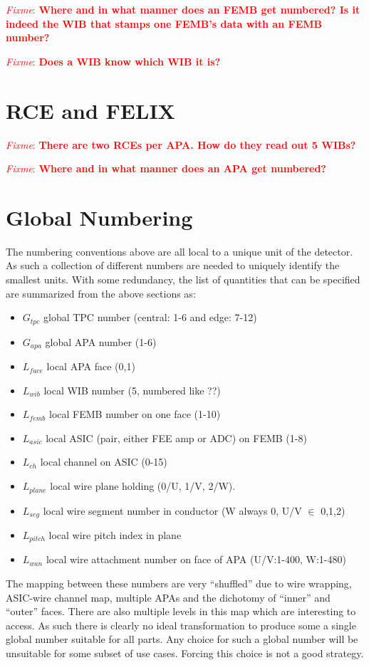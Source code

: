 \documentclass[pdftex,12pt,letter]{article}
\newcommand{\fixme}[1]{\textcolor{red}{\textit{Fixme}: \textbf{#1}}}
\begin{document}
\fixme{Where and in what manner does an FEMB get numbered?  Is it indeed the WIB that stamps one FEMB's data with an FEMB number?}

\fixme{Does a WIB know which WIB it is?}

\section{RCE and FELIX}

\fixme{There are two RCEs per APA.  How do they read out 5 WIBs?}

\fixme{Where and in what manner does an APA get numbered?}

\section{Global Numbering}

The numbering conventions above are all local to a unique unit of the
detector.  As such a collection of different numbers are needed to
uniquely identify the smallest units.  With some redundancy, the list
of quantities that can be specified are summarized from the above
sections as:

\begin{itemize}
\item $G_{tpc}$ global TPC number (central: 1-6 and edge: 7-12)
\item $G_{apa}$ global APA number (1-6)
\item $L_{face}$ local APA face (0,1)
\item $L_{wib}$ local WIB number (5, numbered like ??)
\item $L_{femb}$ local FEMB number on one face (1-10)
\item $L_{asic}$ local ASIC (pair, either FEE amp or ADC) on FEMB (1-8)
\item $L_{ch}$ local channel on ASIC (0-15)
\item $L_{plane}$ local wire plane holding (0/U, 1/V, 2/W).
\item $L_{seg}$ local wire segment number in conductor (W always 0, U/V $\in$ 0,1,2)
\item $L_{pitch}$ local wire pitch index in plane
\item $L_{wan}$ local wire attachment number on face of APA (U/V:1-400, W:1-480)
\end{itemize}

The mapping between these numbers are very ``shuffled'' due to wire
wrapping, ASIC-wire channel map, multiple APAs and the dichotomy of
``inner'' and ``outer'' faces.  There are also multiple levels in this
map which are interesting to access.  As such there is clearly no
ideal transformation to produce some a single global number suitable
for all parts.  Any choice for such a global number will be unsuitable
for some subset of use cases.  Forcing this choice is not a good
strategy.
\end{document}
